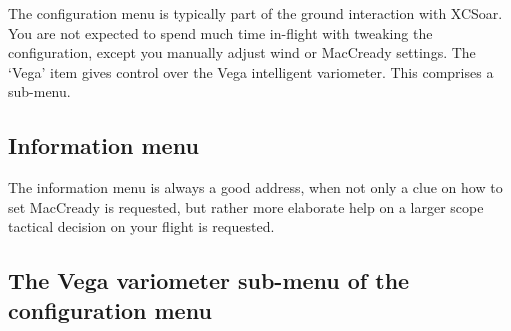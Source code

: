 The configuration menu is typically part of the ground interaction with 
XCSoar. You are not expected to spend much time in-flight with tweaking 
the configuration, except you manually adjust wind or MacCready settings. 
The `Vega' item gives control over the  Vega intelligent variometer. This 
comprises a sub-menu.


\subsection*{Information menu}
\noindent{}

The information menu is always a good address, when not only a clue on 
how to set MacCready is requested, but rather more elaborate help on a 
larger scope tactical decision on your flight is requested.


\subsection*{The Vega variometer sub-menu of the configuration menu}
\noindent{}

